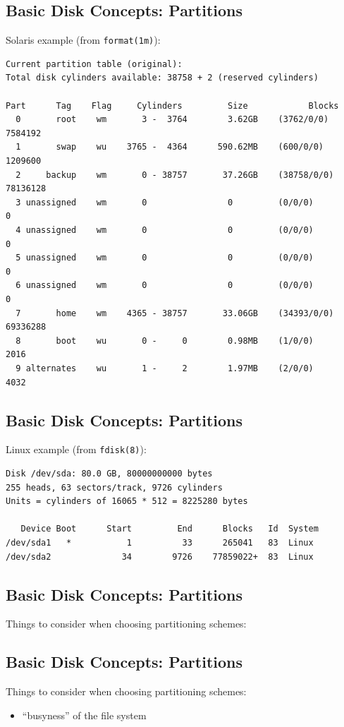 \documentclass[xga]{xdvislides}
\begin{document}
\subsection{Basic Disk Concepts: Partitions}
Solaris example (from {\tt format(1m)}):
\begin{verbatim}
Current partition table (original):
Total disk cylinders available: 38758 + 2 (reserved cylinders)

Part      Tag    Flag     Cylinders         Size            Blocks
  0       root    wm       3 -  3764        3.62GB    (3762/0/0)   7584192
  1       swap    wu    3765 -  4364      590.62MB    (600/0/0)    1209600
  2     backup    wm       0 - 38757       37.26GB    (38758/0/0) 78136128
  3 unassigned    wm       0                0         (0/0/0)            0
  4 unassigned    wm       0                0         (0/0/0)            0
  5 unassigned    wm       0                0         (0/0/0)            0
  6 unassigned    wm       0                0         (0/0/0)            0
  7       home    wm    4365 - 38757       33.06GB    (34393/0/0) 69336288
  8       boot    wu       0 -     0        0.98MB    (1/0/0)         2016
  9 alternates    wu       1 -     2        1.97MB    (2/0/0)         4032
\end{verbatim}

\subsection{Basic Disk Concepts: Partitions}
Linux example (from {\tt fdisk(8)}):
\begin{verbatim}
Disk /dev/sda: 80.0 GB, 80000000000 bytes
255 heads, 63 sectors/track, 9726 cylinders
Units = cylinders of 16065 * 512 = 8225280 bytes

   Device Boot      Start         End      Blocks   Id  System
/dev/sda1   *           1          33      265041   83  Linux
/dev/sda2              34        9726    77859022+  83  Linux
\end{verbatim}

\subsection{Basic Disk Concepts: Partitions}
Things to consider when choosing partitioning schemes:

\subsection{Basic Disk Concepts: Partitions}
Things to consider when choosing partitioning schemes:
\begin{itemize}
	\item ``busyness'' of the file system
\end{itemize}
\end{document}
